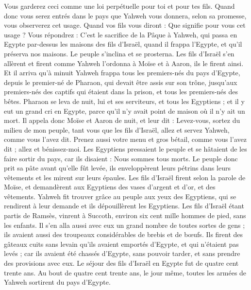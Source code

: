 \begin{multicols}{2}
Vous garderez ceci comme une loi perpétuelle pour toi et pour tes fils.
Quand donc vous serez entrés dans le pays que Yahweh vous donnera, selon sa promesse, vous observerez cet usage.
Quand vos fils vous diront : Que signifie pour vous cet usage ?
Vous répondrez : C'est le sacrifice de la Pâque à Yahweh, qui passa en Egypte par-dessus les maisons des fils d'Israël, quand il frappa l'Egypte, et qu'il préserva nos maisons. Le peuple s'inclina et se prosterna.
Les fils d'Israël s'en allèrent et firent comme Yahweh l’ordonna à Moïse et à Aaron, ils le firent ainsi.
Et il arriva qu'à minuit Yahweh frappa tous les premiers-nés du pays d'Egypte, depuis le premier-né de Pharaon, qui devait être assis sur son trône, jusqu'aux premiers-nés des captifs qui étaient dans la prison, et tous les premiers-nés des bêtes.
Pharaon se leva de nuit, lui et ses serviteurs, et tous les Egyptiens ; et il y eut un grand cri en Egypte, parce qu'il n'y avait point de maison où il n'y ait un mort.
Il appela donc Moïse et Aaron de nuit, et leur dit : Levez-vous, sortez du milieu de mon peuple, tant vous que les fils d'Israël, allez et servez Yahweh, comme vous l’avez dit.
Prenez aussi votre menu et gros bétail, comme vous l’avez dit ; allez et bénissez-moi.
Les Egyptiens pressaient le peuple et se hâtaient de les faire sortir du pays, car ils disaient : Nous sommes tous morts.
Le peuple donc prit sa pâte avant qu'elle fût levée, ils enveloppèrent leurs pétrins dans leurs vêtements et les mirent sur leurs épaules.
Les fils d'Israël firent selon la parole de Moïse, et demandèrent aux Egyptiens des vases d'argent et d'or, et des vêtements.
Yahweh fit trouver grâce au peuple aux yeux des Egyptiens, qui se rendirent à leur demande et ils dépouillèrent les Egyptiens.
Les fils d'Israël étant partis de Ramsès, vinrent à Succoth, environ six cent mille hommes de pied, sans les enfants.
Il s'en alla aussi avec eux un grand nombre de toutes sortes de gens ; ils avaient aussi des troupeaux considérables de brebis et de bœufs.
Ils firent des gâteaux cuits sans levain qu’ils avaient emportés d’Egypte, et qui n’étaient pas levés ; car ils avaient été chassés d’Egypte, sans pouvoir tarder, et sans prendre des provisions avec eux.
Le séjour des fils d'Israël en Egypte fut de quatre cent trente ans.
Au bout de quatre cent trente ans, le jour même, toutes les armées de Yahweh sortirent du pays d'Egypte.

\end{multicols}
